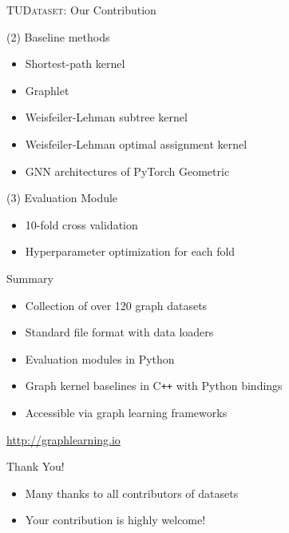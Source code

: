 \documentclass[utf8, xcolor=dvipsnames,ngerman]{beamer}
\begin{document}
\begin{frame}{\textsc{TUDataset}: Our Contribution}

\begin{block}{(2) Baseline methods}
 \begin{itemize}
  \item Shortest-path kernel 
  \item Graphlet  
  \item Weisfeiler-Lehman subtree kernel 
  \item Weisfeiler-Lehman optimal assignment kernel 
  \item GNN architectures of PyTorch Geometric 
 \end{itemize}
\end{block}

\pause

\begin{block}{(3) Evaluation Module}
 \begin{itemize}
  \item 10-fold cross validation
  \item Hyperparameter optimization for each fold
 \end{itemize}
\end{block}
 
\end{frame}


\begin{frame}{Summary}

\begin{itemize}
 \item Collection of over 120 graph datasets 
 \item Standard file format with data loaders
 \item Evaluation modules in Python
 \item Graph kernel baselines in C\texttt{++} with Python bindings
 \item Accessible via graph learning frameworks
\end{itemize}

\vspace{1.5em}

\pause

\begin{center}
 \Large{ \url{http://graphlearning.io}}
\end{center}

\vspace{1.5em}

\pause
\begin{block}{Thank You!}
\begin{itemize}
 \item Many thanks to all contributors of datasets
 \item Your contribution is highly welcome!
\end{itemize}

\end{block}



\end{frame}
\end{document}
